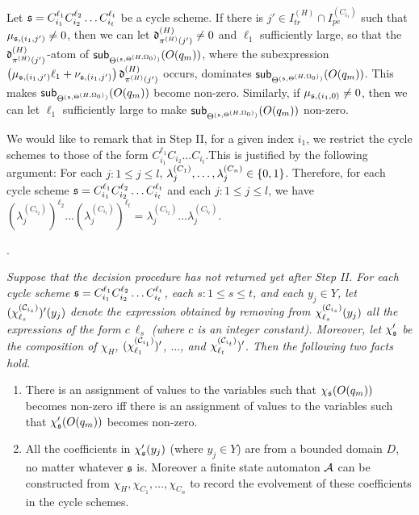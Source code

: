 \medskip

Let $\schm=C_{i_1}^{\ell_1} C_{i_2}^{\ell_2} \dots C_{i_t}^{\ell_t}$ be a cycle scheme. If there is $j' \in I^{(H)}_{tr} \cap I^{(C_{i_1})}_{pe}$ such that $\mu_{\schm,(i_1,j')} \neq 0$, then we can let $\vard^{(H)}_{\pi^{(H)}(j')} \neq 0$ and $\ell_1$ sufficiently large, so that the $\vard^{(H)}_{\pi^{(H)}(j')}$-atom of $\sub{O(q_m)}{\sumf^{(\schm,\sumf^{(H,\initval_0)})}}$, where the subexpression $\left(\mu_{\schm, (i_1,j')} \ell_1 + \nu_{\schm, (i_1,j')} \right)\vard^{(H)}_{\pi^{(H)}(j')}$ occurs, dominates $\sub{O(q_m)}{\sumf^{(\schm,\sumf^{(H,\initval_0)})}}$. This makes $\sub{O(q_m)}{\sumf^{(\schm,\sumf^{(H,\initval_0)})}}$ become non-zero. Similarly, if $\mu_{\schm,(i_1,0)} \neq 0$, then we can let $\ell_1$ sufficiently large to make $\sub{O(q_m)}{\sumf^{(\schm,\sumf^{(H,\initval_0)})}}$ non-zero.

\smallskip

We would like to remark that in Step II, for a given index $i_1$, we restrict the cycle schemes to those of the form $C_{i_1}^{\ell_1} C_{i_2} \dots C_{i_t}$.This is justified by the following argument: For each $j: 1 \le j \le l$, $\cstl^{(C_{1})}_j, \dots, \cstl^{(C_{n})}_j \in \{0,1\}$. Therefore, for each cycle scheme $\schm=C_{i_1}^{\ell_1} C_{i_2}^{\ell_2} \dots C_{i_t}^{\ell_t}$ and each $j: 1 \le j \le l$,  we have $(\lambda^{(C_{i_2})}_{j})^{\ell_2} \dots (\lambda^{(C_{i_t})}_{j})^{\ell_t} = \lambda^{(C_{i_2})}_{j} \dots \lambda^{(C_{i_t})}_{j}$.



\medskip

. 
{\it 
Suppose that the decision procedure has not returned yet after Step II. For each cycle scheme $\schm=C_{i_1}^{\ell_1} C_{i_2}^{\ell_2} \dots C_{i_t}^{\ell_t}$, each $s: 1 \le s \le t$, and each $y_j \in Y$, let $(\chi^{(\Cc_{i_s})}_{\ell_s})'(y_j)$ denote the expression obtained by removing from $\chi^{(\Cc_{i_s})}_{\ell_s}(y_j)$  all the expressions of the form $c\ \ell_s$ (where $c$ is an integer constant).  Moreover, let $\chi'_\schm$ be the composition of $\chi_H$, $(\chi^{(\Cc_{i_1})}_{\ell_1})'$, $\dots$, and $\chi^{(\Cc_{i_t})}_{\ell_t})'$. Then the following two facts hold.
\begin{enumerate}
\item There is an assignment of values to the variables such that $\chi_\schm(O(q_m))$ becomes non-zero iff there is an assignment of values to the variables such that $\chi'_\schm(O(q_m))$ becomes non-zero.
%
\item All the coefficients in $\chi'_\schm(y_j)$ (where $y_j \in Y$) are from a bounded domain $D$, no matter whatever $\schm$ is. Moreover a finite state automaton $\Aa$ can be constructed from $\chi_H,\chi_{C_1},\dots,\chi_{C_n}$ to record the evolvement of these coefficients  in the cycle schemes.
\end{enumerate}
}

